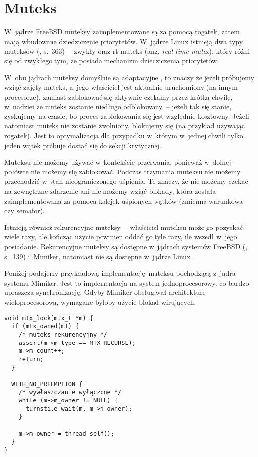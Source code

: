 \documentclass[shortabstract]{iithesis}
\theoremstyle{definition} \newtheorem*{definition}{Definicja}
\theoremstyle{definition} \newtheorem*{example}{Przykład}
\theoremstyle{definition} \newtheorem*{remark}{Uwaga}
\begin{document}
\section{Muteks}
\label{sec:kernel_mutex}

W~jądrze FreeBSD muteksy zaimplementowane są za pomocą rogatek, zatem mają wbudowane dziedziczenie priorytetów.
W~jądrze Linux istnieją dwa typy muteksów (\cite{bib:lka}, s.~363)~-- zwykły oraz rt-muteks (ang.
\textit{real-time mutex}), który różni się od zwykłego tym, że posiada mechanizm dziedziczenia priorytetów.

W~obu jądrach muteksy domyślnie są adaptacyjne \cite{freebsd:locking} \cite{linux:mutex_design},
to znaczy że jeżeli próbujemy wziąć zajęty muteks, a~jego
właściciel jest aktualnie uruchomiony (na innym procesorze), zamiast zablokować się aktywnie czekamy przez krótką
chwilę, w~nadziei że muteks zostanie niedługo odblokowany~-- jeżeli tak się stanie,
zyskujemy na czasie, bo proces zablokowania się jest względnie kosztowny.
Jeżeli natomiast muteks nie zostanie zwolniony, blokujemy się (na przykład używając rogatek).
Jest to optymalizacja dla przypadku w~którym w~jednej chwili tylko jeden wątek próbuje dostać się do
sekcji krytycznej.

Muteksu nie możemy używać w~kontekście przerwania, ponieważ w~dolnej połówce nie możemy się zablokować.
Podczas trzymania muteksu nie możemy przechodzić w~stan nieograniczonego uśpienia. To znaczy, że nie możemy
czekać na zewnętrzne zdarzenie ani nie możemy wziąć blokady, która została zaimplementowana za pomocą
kolejek uśpionych wątków (zmienna warunkowa czy semafor).

Istnieją również rekurencyjne muteksy~-- właściciel muteksu może go pozyskać wiele razy, ale kończąc użycie
powinien oddać go tyle razy, ile wszedł w~jego posiadanie. Rekurencyjne muteksy są dostępne w~jądrach
systemów FreeBSD (\cite{bib:freebsd}, s.~139) i~Mimiker, natomiast nie są dostępne w~jądrze
Linux \cite{linux:mutex_design}.

Poniżej podajemy przykładową implementację muteksu pochodzącą z~jądra systemu Mimiker. Jest to implementacja
na system jednoprocesorowy, co bardzo upraszcza synchronizację. Gdyby Mimiker obsługiwał architekturę
wieloprocesorową, wymagane byłoby użycie blokad wirujących.

\begin{lstlisting}
void mtx_lock(mtx_t *m) {
  if (mtx_owned(m)) {
    /* muteks rekurencyjny */
    assert(m->m_type == MTX_RECURSE);
    m->m_count++;
    return;
  }

  WITH_NO_PREEMPTION {
    /* wywłaszczanie wyłączone */
    while (m->m_owner != NULL) {
      turnstile_wait(m, m->m_owner);
    }

    m->m_owner = thread_self();
  }
}
\end{lstlisting}
\end{document}
